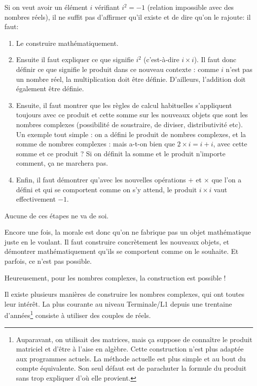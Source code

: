 Si on veut avoir un élément $i$ vérifiant $i^2=-1$ (relation impossible avec des nombres réels), il ne suffit pas d'affirmer qu'il existe et de dire qu'on le rajoute: il faut:
\begin{enumerate}
\item Le construire mathématiquement.
\item Ensuite il faut expliquer ce que signifie $i^2$ (c'est-à-dire $i\times i$). Il faut donc définir ce que signifie le produit dans ce nouveau contexte : comme $i$ n'est pas un nombre réel, la multiplication doit être définie. D'ailleurs, l'addition doit également être définie.
\item Ensuite, il faut montrer que les règles de calcul habituelles s'appliquent toujours avec ce produit et cette  somme sur les nouveaux objets que sont les nombres complexes (possibilité de soustraire, de diviser, distributivité etc). Un exemple tout simple : on a défini le produit de nombres complexes, et la somme de nombres complexes : mais a-t-on bien que $2\times i = i+i$, avec cette somme et ce produit ? Si on définit la somme et le produit n'importe comment, ça ne marchera pas.
\item Enfin, il faut démontrer qu'avec les nouvelles opérations $+$ et $\times$ que l'on a défini et qui se comportent comme on s'y attend, le produit $i\times i$ vaut effectivement $-1$.
\end{enumerate}    

Aucune de ces étapes ne va de soi.


\begin{mdframed}
Encore une fois, la morale est donc qu'on ne fabrique pas un objet mathématique juste en le voulant. Il faut construire concrètement les nouveaux objets, et démontrer mathématiquement qu'ils se comportent comme on le souhaite. Et parfois, ce n'est pas possible.

Heureusement, pour les nombres complexes, la construction est possible !
\end{mdframed}


Il existe plusieurs manières de construire les nombres complexes, qui ont toutes leur intérêt. La plus courante au niveau Terminale/L1 depuis une trentaine d'années\footnote{Auparavant, on utilisait des matrices, mais ça suppose de connaître le produit matriciel et d'être à l'aise en algèbre. Cette construction n'est plus adaptée aux programmes actuels. La méthode actuelle est plus simple et au bout du compte équivalente. Son seul défaut est de \og parachuter\fg{} la formule du produit sans trop expliquer d'où elle provient.} consiste à utiliser des couples de réels.




